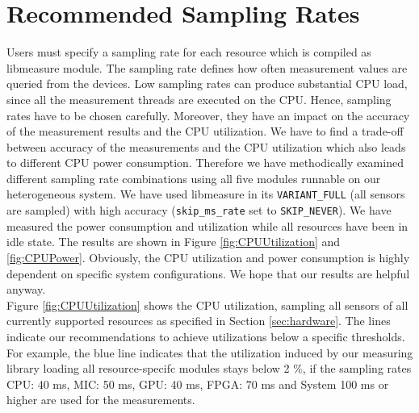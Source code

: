 %
%
%
%
%
%

\section{Recommended Sampling Rates} \label{app:A}
Users must specify a sampling rate for each resource which is compiled as libmeasure module. The sampling rate defines how often measurement values are queried from the devices. Low sampling rates can produce substantial CPU load, since all the measurement threads are executed on the CPU. Hence, sampling rates have to be chosen carefully. Moreover, they have an impact on the accuracy of the measurement results and the CPU utilization. We have to find a trade-off between accuracy of the measurements and the CPU utilization which also leads to different CPU power consumption. Therefore we have methodically examined different sampling rate combinations using all five modules runnable on our heterogeneous system. We have used libmeasure in its \texttt{VARIANT\_FULL} (all sensors are sampled) with high accuracy (\texttt{skip\_ms\_rate} set to \texttt{SKIP\_NEVER}). We have measured the power consumption and utilization while all resources have been in idle state. The results are shown in Figure \ref{fig:CPUUtilization} and \ref{fig:CPUPower}. Obviously, the CPU utilization and power consumption is highly dependent on specific system configurations. We hope that our results are helpful anyway.\\

Figure \ref{fig:CPUUtilization} shows the CPU utilization, sampling all sensors of all currently supported resources as specified in Section \ref{sec:hardware}. The lines indicate our recommendations to achieve utilizations below a specific thresholds. For example, the blue line indicates that the utilization induced by our measuring library loading all resource-specifc modules stays below 2 \%, if the sampling rates CPU: 40 ms, MIC: 50 ms, GPU: 40 ms, FPGA: 70 ms and System 100 ms or higher are used for the measurements.

